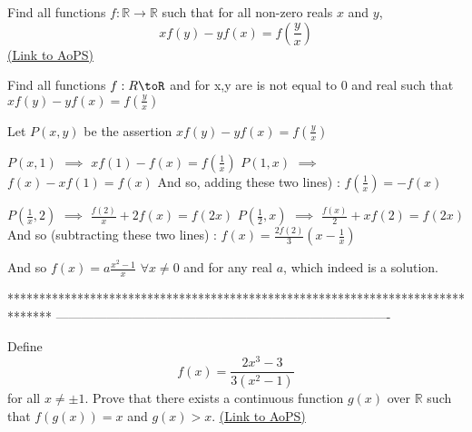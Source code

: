 \begin{problem}
	Find all functions $f: \mathbb R \to \mathbb R$ such that for all non-zero reals $x$ and $y$,
\[xf(y)-yf(x)=f\left(\frac{y}{x}\right)\]
	\flushright \href{https://artofproblemsolving.com/community/c6h444980}{(Link to AoPS)}
\end{problem}



\begin{solution}
	\begin{tcolorbox}Find all functions $f:R\toR$ and for x,y are is not equal to 0 and real such that
$xf(y)-yf(x)=f(\frac{y}{x})$\end{tcolorbox}
Let $P(x,y)$ be the assertion $xf(y)-yf(x)=f(\frac yx)$

$P(x,1)$ $\implies$ $xf(1)-f(x)=f(\frac 1x)$
$P(1,x)$ $\implies$ $f(x)-xf(1)=f(x)$
And so, adding these two lines) : $f(\frac 1x)=-f(x)$

$P(\frac 1x,2)$ $\implies$ $\frac{f(2)}x+2f(x)=f(2x)$
$P(\frac 12,x)$ $\implies$ $\frac{f(x)}2+xf(2)=f(2x)$
And so (subtracting these two lines) : $f(x)=\frac{2f(2)}3(x-\frac 1x)$

And so $\boxed{f(x)=a\frac {x^2-1}x}$ $\forall x\ne 0$ and for any real $a$, which indeed is a solution.
\end{solution}
*******************************************************************************
-------------------------------------------------------------------------------

\begin{problem}
	Define \[f(x)=\frac{2x^{3}-3}{3(x^{2}-1)} \] for all $x\neq \pm 1$. Prove that there exists a continuous function $g(x)$ over $\mathbb R$ such that $f(g(x))=x$ and $g(x)>x$.
	\flushright \href{https://artofproblemsolving.com/community/c6h445210}{(Link to AoPS)}
\end{problem}



